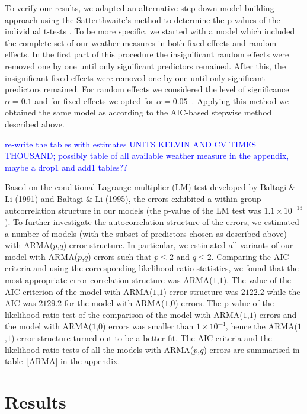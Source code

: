 \documentclass[12pt]{iopart}
\begin{document}
To verify our results, we adapted an alternative step-down model building
approach using the Satterthwaite’s method to determine the p-values of the individual
t-tests \cite{lmerTest}. To be more specific, we started with a model which included the complete set of our weather measures in both fixed effects and random effects. In the first part of this procedure the insignificant random effects were removed one by one until only significant predictors remained. After this, the insignificant fixed effects were removed one by one until only significant predictors remained. For random effects we considered the level of significance $\alpha=0.1$ and for fixed effects we opted for $\alpha=0.05$~\cite{lmerTest}. Applying this method we obtained the same model as according to the AIC-based stepwise method described above.

\textcolor{blue}{re-write the tables with estimates  UNITS KELVIN AND CV TIMES THOUSAND; possibly table of all available weather measure in the appendix, maybe a drop1 and add1 tables??}


Based on the conditional Lagrange multiplier (LM) test developed by Baltagi \& Li (1991) and Baltagi \& Li (1995), the errors exhibited a within group autcorrelation structure in our models (the p-value of the LM test was $1.1\times10^{-13}$). To further investigate the autocorrelation structure of the errors, we estimated a number of models (with the subset of predictors chosen as described above) with ARMA($p$,$q$) error structure. In particular, we estimated all variants of our model with ARMA($p$,$q$) errors such that $p\leq2$ and $q\leq2$. Comparing the AIC criteria and using the corresponding likelihood ratio statistics, we found that the most appropriate error correlation structure was ARMA($1$,$1$). The value of the AIC criterion of the model with ARMA($1$,$1$) error structure was $2122.2$ while the AIC was $2129.2$ for the model with ARMA($1$,$0$) errors.  The p-value of the likelihood ratio test of the comparison of the model with ARMA($1$,$1$) errors and the model with ARMA($1$,$0$) errors was smaller than $1 \times10^{-4}$, hence the ARMA($1$,$1$) error structure turned out to be a better fit. The AIC criteria and the likelihood ratio tests of all the models with ARMA($p$,$q$) errors are summarised in table~\ref{ARMA} in the appendix.

	\section{Results}\label{Results}
	
\end{document}
